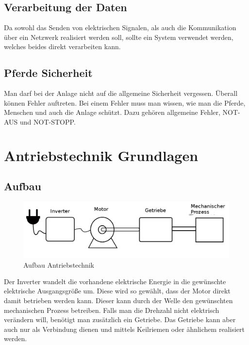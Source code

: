 \subsection{Verarbeitung der Daten}
\label{sec:verarbeitungDerDaten}

Da sowohl das Senden von elektrischen Signalen, als auch die Kommunikation über ein Netzwerk realisiert werden soll, sollte ein System verwendet werden, welches beides direkt verarbeiten kann. 

\subsection{Pferde Sicherheit}
\label{sec:pferdeSicherheit}

Man darf bei der Anlage nicht auf die allgemeine Sicherheit vergessen. Überall können Fehler auftreten. Bei einem Fehler muss man wissen, wie man die Pferde, Menschen und auch die Anlage schützt. Dazu gehören allgemeine Fehler, NOT-AUS und NOT-STOPP.
\newpage

\section{Antriebstechnik Grundlagen}
\label{sec:antriebstechnikGrundlagen}

\subsection{Aufbau}
\label{sec:aufbau}
\begin{figure}[!ht]
\begin{center}
	\caption{Aufbau Antriebstechnik}
	\includegraphics[width=1\textwidth]{AntriebstechnikAufbau}
\end{center}
\end{figure}

Der Inverter wandelt die vorhandene elektrische Energie in die gewünschte elektrische Ausgangsgröße um. 
Diese wird so gewählt, dass der Motor direkt damit betrieben werden kann. Dieser kann durch der Welle den gewünschten mechanischen Prozess betreiben.  Falls man die Drehzahl nicht elektrisch verändern will, benötigt man zusätzlich ein Getriebe. Das Getriebe kann aber auch nur als Verbindung dienen und mittels Keilriemen oder ähnlichem realisiert werden.


